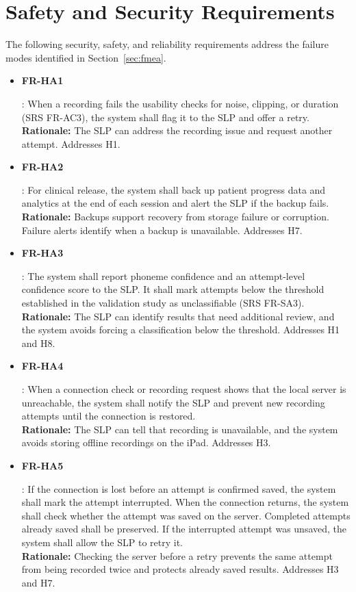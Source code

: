 \documentclass{article}
\begin{document}
\section{Safety and Security Requirements}

The following security, safety, and reliability requirements address the
failure modes identified in Section~\ref{sec:fmea}.

\begin{itemize}
\item \hypertarget{ha:FR-HA1}{\textbf{FR-HA1}}: When a recording fails the usability checks for noise, clipping, or duration
(SRS FR-AC3), the system shall flag it to the SLP and offer a retry. \\
\textbf{Rationale:} The SLP can address the recording issue and request
another attempt. Addresses H1.

\item \hypertarget{ha:FR-HA2}{\textbf{FR-HA2}}: For clinical release, the system shall back up patient progress data and
analytics at the end of each session and alert the SLP if the backup fails. \\
\textbf{Rationale:} Backups support recovery from storage failure or
corruption. Failure alerts identify when a backup is unavailable. Addresses H7.

\item \hypertarget{ha:FR-HA3}{\textbf{FR-HA3}}: The system shall report phoneme confidence and an attempt-level confidence
score to the SLP. It shall mark attempts below the threshold established in
the validation study as unclassifiable (SRS FR-SA3). \\
\textbf{Rationale:} The SLP can identify results that need additional review,
and the system avoids forcing a classification below the threshold.
Addresses H1 and H8.

\item \hypertarget{ha:FR-HA4}{\textbf{FR-HA4}}: When a connection check or recording request shows
that the local server is unreachable, the system shall notify the SLP and
prevent new recording attempts until the connection is restored.\\
\textbf{Rationale:} The SLP can tell that recording is unavailable, and
the system avoids storing offline recordings on the iPad. Addresses H3.

\item \hypertarget{ha:FR-HA5}{\textbf{FR-HA5}}: If the connection is lost before an attempt is
confirmed saved, the system shall mark the attempt interrupted. When the
connection returns, the system shall check whether the attempt was saved on
the server. Completed attempts already saved shall be preserved. If the
interrupted attempt was unsaved, the system shall allow the SLP to retry it.\\
\textbf{Rationale:} Checking the server before a retry prevents the same
attempt from being recorded twice and protects already saved results. Addresses H3 and H7.


\end{itemize}
\end{document}
